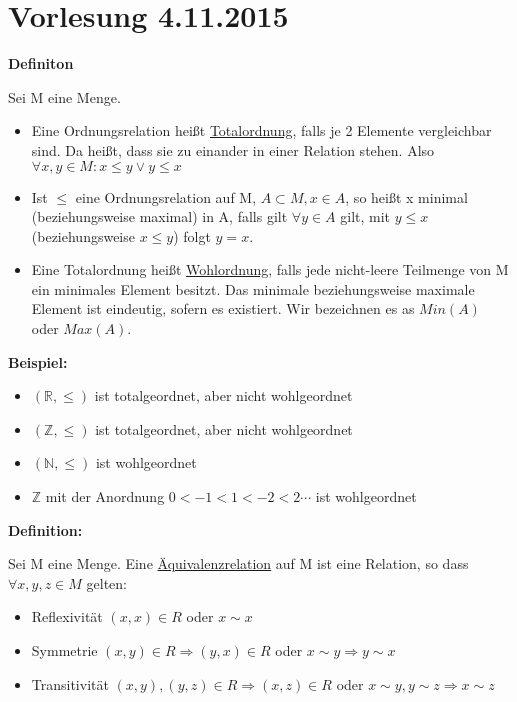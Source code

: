 \documentclass[pdftex,12pt,a4paper,fleqn]{scrartcl}
\begin{document}

\section{Vorlesung 4.11.2015} %
\label{sec:vorlesung_4_11_2015}

\textbf{Definiton}

Sei M eine Menge. 

\begin{itemize}
	\item Eine Ordnungsrelation heißt \underline{Totalordnung}, falls je 2 Elemente vergleichbar sind. Da heißt, dass sie zu einander in einer Relation stehen. Also $\forall x,y \in M : x \leq y \lor y \leq x$
	\item Ist $\leq$ eine Ordnungsrelation auf M, $A \subset M, x \in A$, so heißt x minimal (beziehungsweise maximal) in A, falls gilt 
	$\forall y \in A$ gilt, mit $y \leq x$ (beziehungsweise $x \leq y$) folgt $y = x$.
	\item Eine Totalordnung heißt \underline{Wohlordnung}, falls jede nicht-leere Teilmenge von M ein minimales Element besitzt. 
	Das minimale beziehungsweise maximale Element ist eindeutig, sofern es existiert. Wir bezeichnen es as $Min(A)$ oder $Max(A)$.
\end{itemize}

\textbf{Beispiel:}
\begin{itemize}
	\item $(\mathbb{R}, \leq )$ ist totalgeordnet, aber nicht wohlgeordnet
	\item $(\mathbb{Z}, \leq )$ ist totalgeordnet, aber nicht wohlgeordnet
	\item $(\mathbb{N}, \leq )$ ist wohlgeordnet
	\item $\mathbb{Z}$ mit der Anordnung $0 < -1 < 1 < -2 < 2 \cdots$ ist wohlgeordnet
\end{itemize}

\textbf{Definition:}

Sei M eine Menge. Eine \underline{Äquivalenzrelation} auf M ist eine Relation, so dass $\forall x,y,z \in M$ gelten:
\begin{itemize}
	\item Reflexivität $(x,x) \in R$ oder $x \sim x$
	\item Symmetrie $(x,y) \in R \Rightarrow (y,x) \in R$ oder $x \sim y \Rightarrow y \sim x$
	\item Transitivität $(x,y),(y,z) \in R \Rightarrow (x,z) \in R$ oder $x \sim y, y \sim z \Rightarrow x \sim z$
\end{itemize}
\end{document}
